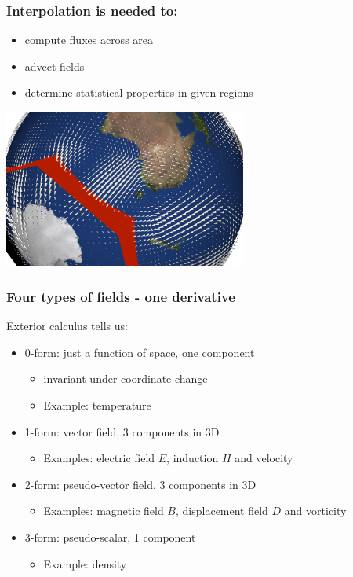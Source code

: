\documentclass[aspectratio=169]{beamer}
\begin{document}
\begin{frame}[t]
  \frametitle{Interpolation is needed to:}
  \begin{itemize}
   \item compute fluxes across area
   \item advect fields
   \item determine statistical properties in given regions
  \end{itemize}
  \begin{center}
    \includegraphics[width=0.6\textwidth]{fluxIntegral.png}
  \end{center}
  
\end{frame}

\begin{frame}[t]
  \frametitle{Four types of fields - one derivative}
    \begin{block}{Exterior calculus tells us:}
      \begin{itemize}%
	  \item {\color{red} 0-form}: just a function of space, one component
        \begin{itemize}
          \item invariant under coordinate change
          \item Example: temperature
        \end{itemize}
      \item {\color{red} 1-form}: vector field, 3 components in 3D
        \begin{itemize}
          \item Examples: electric field $E$, induction $H$ and velocity
        \end{itemize}
      \item {\color{red} 2-form}: pseudo-vector field, 3 components in 3D
         \begin{itemize}
          \item Examples: magnetic field $B$, displacement field $D$ and vorticity
        \end{itemize}
   \item {\color{red} 3-form}: pseudo-scalar, 1 component
         \begin{itemize}
          \item Example: density
        \end{itemize}
    \end{itemize}
  \end{block}
\end{frame}
\end{document}
